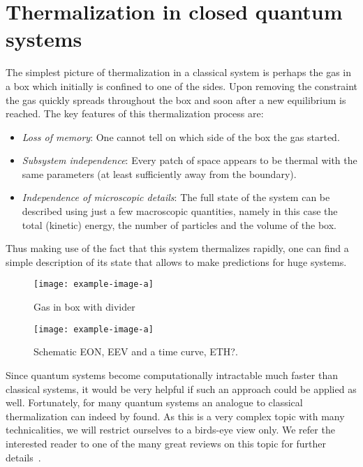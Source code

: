 \section{Thermalization in closed quantum systems}
\label{sec:Thermalization-in-closed-QS}
The simplest picture of thermalization in a classical system is perhaps the gas in a box which initially is confined to one of the sides. Upon removing the constraint the gas quickly spreads throughout the box and soon after a new equilibrium is reached. The key features of this thermalization process are:
\begin{itemize}
	\item \emph{Loss of memory}: One cannot tell on which side of the box the gas started.
	\item \emph{Subsystem independence}: Every patch of space appears to be thermal with the same parameters (at least sufficiently away from the boundary).
	\item \emph{Independence of microscopic details}: The full state of the system can be described using just a few macroscopic quantities, namely in this case the total (kinetic) energy, the number of particles and the volume of the box.
\end{itemize}
Thus making use of the fact that this system thermalizes rapidly, one can find a simple description of its state that allows to make predictions for huge systems.

\begin{figure}[htb]
	\centering
	\texttt{[image: example-image-a]}
	\caption{Gas in box with divider}
\end{figure}



\begin{figure}[htb]
	\centering
	\texttt{[image: example-image-a]}
	\caption{Schematic EON, EEV and a time curve, ETH?.}
\end{figure}

Since quantum systems become computationally intractable much faster than classical systems, it would be very helpful if such an approach could be applied as well. Fortunately, for many quantum systems an analogue to classical thermalization can indeed by found. 
As this is a very complex topic with many technicalities, we will restrict ourselves to a birds-eye view only. We refer the interested reader to one of the many great reviews on this topic for further details~\cite{gogolinEquilibrationThermalisationEmergence2016,dalessioQuantumChaosEigenstate2016,deutschEigenstateThermalizationHypothesis2018,moriThermalizationPrethermalizationIsolated2018}.

